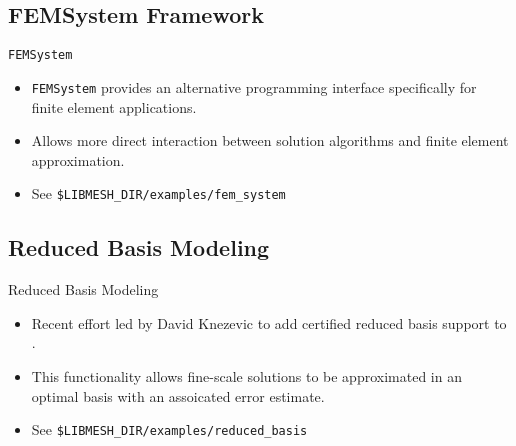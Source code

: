 \subsection{FEMSystem Framework}
\frame
{
  \begin{block}{\texttt{FEMSystem}}
    \begin{itemize}
    \item \texttt{FEMSystem} provides an alternative programming interface specifically for finite element applications.
    \item Allows more direct interaction between solution algorithms and finite element approximation.
    \item See \texttt{\$LIBMESH\_DIR/examples/fem\_system}      
    \end{itemize}
  \end{block}
}


\subsection{Reduced Basis Modeling}
\frame
{
  \begin{block}{Reduced Basis Modeling}
    \begin{itemize}
      \item Recent effort led by David Knezevic to add certified reduced basis support to \libMesh{}.
      \item This functionality allows fine-scale solutions to be approximated in an optimal basis with an assoicated error estimate.
      \item See \texttt{\$LIBMESH\_DIR/examples/reduced\_basis}
    \end{itemize}
  \end{block}
}
